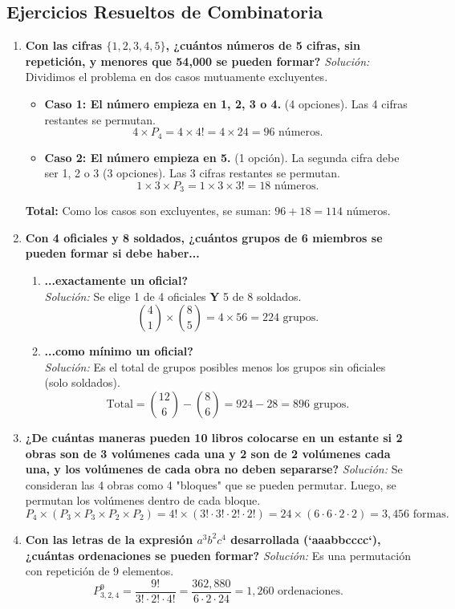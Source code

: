 \documentclass[12pt, letterpaper]{article}
\begin{document}
\subsection{Ejercicios Resueltos de Combinatoria}
\begin{enumerate}
	\item \textbf{Con las cifras $\{1, 2, 3, 4, 5\}$, ¿cuántos números de 5 cifras, sin repetición, y menores que 54,000 se pueden formar?}
	      \textit{Solución:} Dividimos el problema en dos casos mutuamente excluyentes.
	      \begin{itemize}
		      \item \textbf{Caso 1: El número empieza en 1, 2, 3 o 4.} (4 opciones). Las 4 cifras restantes se permutan.
		            \[ 4 \times P_4 = 4 \times 4! = 4 \times 24 = 96 \text{ números.} \]
		      \item \textbf{Caso 2: El número empieza en 5.} (1 opción). La segunda cifra debe ser 1, 2 o 3 (3 opciones). Las 3 cifras restantes se permutan.
		            \[ 1 \times 3 \times P_3 = 1 \times 3 \times 3! = 18 \text{ números.} \]
	      \end{itemize}
	      \textbf{Total:} Como los casos son excluyentes, se suman: $96 + 18 = 114$ números.

	\item \textbf{Con 4 oficiales y 8 soldados, ¿cuántos grupos de 6 miembros se pueden formar si debe haber...}
	      \begin{enumerate}
		      \item \textbf{...exactamente un oficial?} \\
		            \textit{Solución:} Se elige 1 de 4 oficiales \textbf{Y} 5 de 8 soldados.
		            \[ \binom{4}{1} \times \binom{8}{5} = 4 \times 56 = 224 \text{ grupos.} \]
		      \item \textbf{...como mínimo un oficial?} \\
		            \textit{Solución:} Es el total de grupos posibles menos los grupos sin oficiales (solo soldados).
		            \[ \text{Total} = \binom{12}{6} - \binom{8}{6} = 924 - 28 = 896 \text{ grupos.} \]
	      \end{enumerate}

	\item \textbf{¿De cuántas maneras pueden 10 libros colocarse en un estante si 2 obras son de 3 volúmenes cada una y 2 son de 2 volúmenes cada una, y los volúmenes de cada obra no deben separarse?}
	      \textit{Solución:} Se consideran las 4 obras como 4 "bloques" que se pueden permutar. Luego, se permutan los volúmenes dentro de cada bloque.
	      \[ P_4 \times (P_3 \times P_3 \times P_2 \times P_2) = 4! \times (3! \cdot 3! \cdot 2! \cdot 2!) = 24 \times (6 \cdot 6 \cdot 2 \cdot 2) = 3,456 \text{ formas.} \]

	\item \textbf{Con las letras de la expresión \texorpdfstring{$a^3b^2c^4$}{a3b2c4} desarrollada (`aaabbcccc`), ¿cuántas ordenaciones se pueden formar?}
	      \textit{Solución:} Es una permutación con repetición de 9 elementos.
	      \[ P_{3,2,4}^{9} = \frac{9!}{3! \cdot 2! \cdot 4!} = \frac{362,880}{6 \cdot 2 \cdot 24} = 1,260 \text{ ordenaciones.} \]
\end{enumerate}
\newpage
\end{document}
